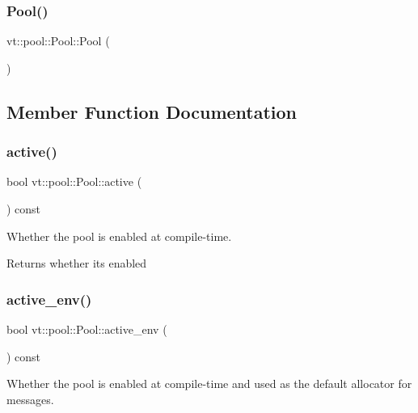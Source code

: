 \subsubsection{\texorpdfstring{Pool()}{Pool()}}
{\footnotesize\ttfamily vt\+::pool\+::\+Pool\+::\+Pool (\begin{DoxyParamCaption}{ }\end{DoxyParamCaption})}



\subsection{Member Function Documentation}
\mbox{\label{structvt_1_1pool_1_1_pool_a3f34112821d767815d5049dc83503033}} 
\subsubsection{\texorpdfstring{active()}{active()}}
{\footnotesize\ttfamily bool vt\+::pool\+::\+Pool\+::active (\begin{DoxyParamCaption}{ }\end{DoxyParamCaption}) const}



Whether the pool is enabled at compile-\/time. 

\begin{DoxyReturn}{Returns}
whether its enabled 
\end{DoxyReturn}
\mbox{\label{structvt_1_1pool_1_1_pool_aa11bdd76d9f6491ac412d5abc5c63274}} 
\subsubsection{\texorpdfstring{active\+\_\+env()}{active\_env()}}
{\footnotesize\ttfamily bool vt\+::pool\+::\+Pool\+::active\+\_\+env (\begin{DoxyParamCaption}{ }\end{DoxyParamCaption}) const}



Whether the pool is enabled at compile-\/time and used as the default allocator for messages. 

